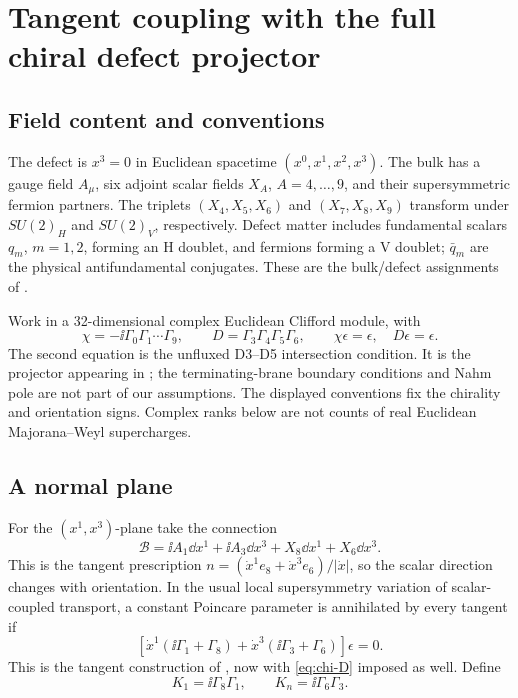 \section{Tangent coupling with the full chiral defect projector}\label{sec:projectors}

\subsection{Field content and conventions}

The defect is $x^3=0$ in Euclidean spacetime $(x^0,x^1,x^2,x^3)$.
The bulk has a gauge field $A_\mu$, six adjoint scalar fields $X_A$,
$A=4,\ldots,9$, and their supersymmetric fermion partners. The triplets
$(X_4,X_5,X_6)$ and $(X_7,X_8,X_9)$ transform under $SU(2)_H$ and
$SU(2)_V$, respectively. Defect matter includes fundamental scalars
$q_m$, $m=1,2$, forming an H doublet, and fermions forming a V doublet;
$\bar q_m$ are the physical antifundamental conjugates. These are the
bulk/defect assignments of \cite{DFO,Baker}.

Work in a 32-dimensional complex Euclidean Clifford module, with
\begin{equation}\label{eq:chi-D}
 \chi=-\ii\Gamma_0\Gamma_1\cdots\Gamma_9,
 \qquad D=\Gamma_3\Gamma_4\Gamma_5\Gamma_6,
 \qquad \chi\epsilon=\epsilon,\quad D\epsilon=\epsilon.
\end{equation}
The second equation is the unfluxed D3--D5 intersection condition.
It is the projector appearing in \cite[eqs.~(2.7), (4.1)--(4.3),
(4.9)]{GW}; the terminating-brane boundary conditions and Nahm pole
are not part of our assumptions. The displayed conventions fix the
chirality and orientation signs. Complex ranks below are not counts
of real Euclidean Majorana--Weyl supercharges.

\subsection{A normal plane}

For the $(x^1,x^3)$-plane take the connection
\begin{equation}\label{eq:plane-connection}
 \mathcal B=\ii A_1\dd x^1+\ii A_3\dd x^3+X_8\dd x^1+X_6\dd x^3.
\end{equation}
This is the tangent prescription $n=(\dot x^1e_8+\dot x^3e_6)/|\dot x|$,
so the scalar direction changes with orientation. In the usual local
supersymmetry variation of scalar-coupled transport, a constant
Poincare parameter is annihilated by every tangent if
\begin{equation}\label{eq:plane-bps}
 [\dot x^1(\ii\Gamma_1+\Gamma_8)
  +\dot x^3(\ii\Gamma_3+\Gamma_6)]\epsilon=0.
\end{equation}
This is the tangent construction of \cite{Zarembo}, now with
\eqref{eq:chi-D} imposed as well. Define
\begin{equation}
 K_1=\ii\Gamma_8\Gamma_1,\qquad K_n=\ii\Gamma_6\Gamma_3.
\end{equation}


